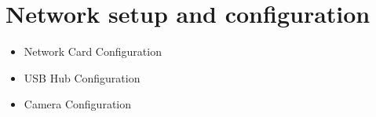 \chapter{Network setup and configuration}
\label{AppendixNetwork}

\begin{itemize}
	\item Network Card Configuration
	\item USB Hub Configuration
	\item Camera Configuration
\end{itemize}